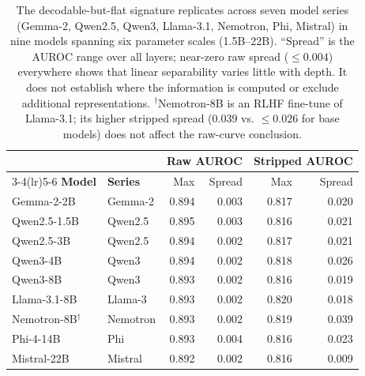\begin{table}[H]
\centering
\small
\setlength\tabcolsep{7pt}
\begin{tabular}{llrrrr}
\toprule
& & \multicolumn{2}{c}{\textbf{Raw AUROC}} & \multicolumn{2}{c}{\textbf{Stripped AUROC}} \\
\cmidrule(lr){3-4}\cmidrule(lr){5-6}
\textbf{Model} & \textbf{Series} & Max & Spread & Max & Spread \\
\midrule
Gemma-2-2B    & Gemma-2   & 0.894 & 0.003 & 0.817 & 0.020 \\
Qwen2.5-1.5B  & Qwen2.5   & 0.895 & 0.003 & 0.816 & 0.021 \\
Qwen2.5-3B    & Qwen2.5   & 0.894 & 0.002 & 0.817 & 0.021 \\
Qwen3-4B      & Qwen3     & 0.894 & 0.002 & 0.818 & 0.026 \\
Qwen3-8B      & Qwen3     & 0.893 & 0.002 & 0.816 & 0.019 \\
Llama-3.1-8B  & Llama-3   & 0.893 & 0.002 & 0.820 & 0.018 \\
Nemotron-8B$^\dagger$  & Nemotron  & 0.893 & 0.002 & 0.819 & 0.039 \\
Phi-4-14B     & Phi       & 0.893 & 0.004 & 0.816 & 0.023 \\
Mistral-22B   & Mistral   & 0.892 & 0.002 & 0.816 & 0.009 \\
\bottomrule
\end{tabular}
\caption{The decodable-but-flat signature replicates across seven model series
  (Gemma-2, Qwen2.5, Qwen3, Llama-3.1, Nemotron, Phi, Mistral) in nine models spanning
  six parameter scales (1.5B--22B). ``Spread'' is the AUROC range over all
  layers; near-zero raw spread ($\le 0.004$) everywhere shows that linear
  separability varies little with depth. It does not establish where the
  information is computed or exclude additional representations.
  $^\dagger$Nemotron-8B is an RLHF fine-tune of Llama-3.1; its higher
  stripped spread (0.039 vs. $\le 0.026$ for base models) does not affect
  the raw-curve conclusion.}
\label{tab:multimodel}
\end{table}
